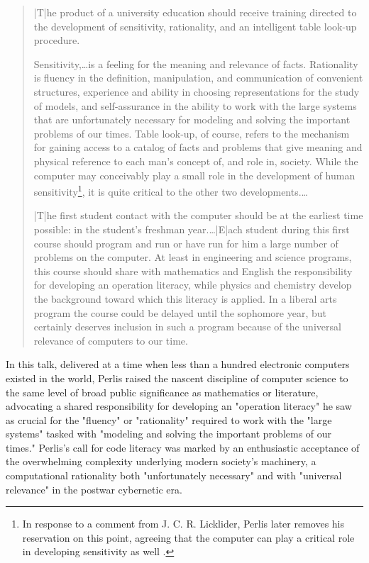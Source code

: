 \blockcquote[187--8]{Perlis62}{
  |T|he product of a university education should receive training directed to the development of sensitivity, rationality, and an intelligent table look-up procedure.
  
  Sensitivity,…is a feeling for the meaning and relevance of facts. Rationality is fluency in the definition, manipulation, and communication of convenient structures, experience and ability in choosing representations for the study of models, and self-assurance in the ability to work with the large systems that are unfortunately necessary for modeling and solving the important problems of our times. Table look-up, of course, refers to the mechanism for gaining access to a catalog of facts and problems that give meaning and physical reference to each man's concept of, and role in, society. While the computer may conceivably play a small role in the development of human sensitivity\footnote{
    In response to a comment from J. C. R. Licklider, Perlis later removes his reservation on this point, agreeing that the computer can play a critical role in developing sensitivity as well \autocite*[204]{Perlis62}.
  }, it is quite critical to the other two developments.…
  
  |T|he first student contact with the computer should be at the earliest time possible: in the student's freshman year.…|E|ach student during this first course should program and run or have run for him a large number of problems on the computer. At least in engineering and science programs, this course should share with mathematics and English the responsibility for developing an operation literacy, while physics and chemistry develop the background toward which this literacy is applied. In a liberal arts program the course could be delayed until the sophomore year, but certainly deserves inclusion in such a program because of the universal relevance of computers to our time.
}
In this talk, delivered at a time when less than a hundred electronic computers existed in the world, Perlis raised the nascent discipline of computer science to the same level of broad public significance as mathematics or literature, advocating a shared responsibility for developing an "operation literacy" he saw as crucial for the "fluency" or "rationality" required to work with the "large systems" tasked with "modeling and solving the important problems of our times." Perlis's call for code literacy was marked by an enthusiastic acceptance of the overwhelming complexity underlying modern society's machinery, a computational rationality both "unfortunately necessary" and with "universal relevance" in the postwar cybernetic era.

